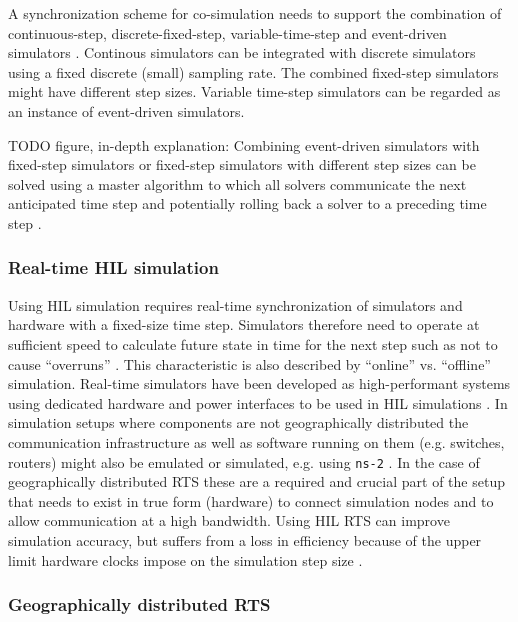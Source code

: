 \documentclass[a4paper,ngerman]{atseminar}
\begin{document}
A synchronization scheme for co-simulation needs to support the combination of continuous-step, discrete-fixed-step, variable-time-step and event-driven simulators \cite{schloegl2015}. Continous simulators can be integrated with discrete simulators using a fixed discrete (small) sampling rate. The combined fixed-step simulators might have different step sizes. Variable time-step simulators can be regarded as an instance of event-driven simulators. 

TODO figure, in-depth explanation:
Combining event-driven simulators with fixed-step simulators or fixed-step simulators with different step sizes can be solved using a master algorithm to which all solvers communicate the next anticipated time step and potentially rolling back a solver to a preceding time step \cite{palensky2017}.

\subsubsection{Real-time HIL simulation}

Using HIL simulation requires real-time synchronization of simulators and hardware with a fixed-size time step. Simulators therefore need to operate at sufficient speed to calculate future state in time for the next step such as not to cause ``overruns'' \cite{belanger2010}. This characteristic is also described by ``online'' vs. ``offline'' simulation. Real-time simulators have been developed as high-performant systems using dedicated hardware and power interfaces to be used in HIL simulations \cite{rtds, opal-rt, vtb-rt}. In simulation setups where components are not geographically
distributed the communication infrastructure as well as software running on them (e.g. switches, routers) might also be emulated or simulated, e.g. using \texttt{ns-2} \cite{epochs, geco}. In the case of geographically distributed RTS these are a required and crucial part of the setup that needs to exist in true form (hardware) to connect simulation nodes and to allow communication at a high bandwidth. Using HIL RTS can improve simulation accuracy, but suffers from a loss in efficiency because of the upper limit hardware
clocks impose on the simulation step size \cite{schloegl2015}.


\subsubsection{Geographically distributed RTS}
\end{document}
